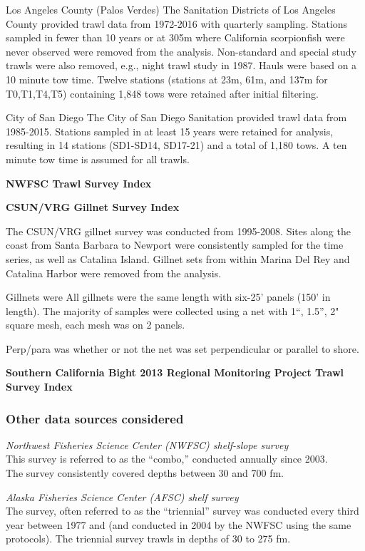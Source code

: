 \documentclass[12pt,]{article}
\begin{document}
Los Angeles County (Palos Verdes) The Sanitation Districts of Los
Angeles County provided trawl data from 1972-2016 with quarterly
sampling. Stations sampled in fewer than 10 years or at 305m where
California scorpionfish were never observed were removed from the
analysis. Non-standard and special study trawls were also removed, e.g.,
night trawl study in 1987. Hauls were based on a 10 minute tow time.
Twelve stations (stations at 23m, 61m, and 137m for T0,T1,T4,T5)
containing 1,848 tows were retained after initial filtering.

City of San Diego The City of San Diego Sanitation provided trawl data
from 1985-2015. Stations sampled in at least 15 years were retained for
analysis, resulting in 14 stations (SD1-SD14, SD17-21) and a total of
1,180 tows. A ten minute tow time is assumed for all trawls.

\textbf{NWFSC Trawl Survey Index}

\textbf{CSUN/VRG Gillnet Survey Index}

The CSUN/VRG gillnet survey was conducted from 1995-2008. Sites along
the coast from Santa Barbara to Newport were consistently sampled for
the time series, as well as Catalina Island. Gillnet sets from within
Marina Del Rey and Catalina Harbor were removed from the analysis.

Gillnets were All gillnets were the same length with six-25' panels
(150' in length). The majority of samples were collected using a net
with 1``, 1.5'', 2" square mesh, each mesh was on 2 panels.

Perp/para was whether or not the net was set perpendicular or parallel
to shore.

\textbf{Southern California Bight 2013 Regional Monitoring Project Trawl
Survey Index}

\subsubsection{Other data sources
considered}\label{other-data-sources-considered}

\emph{Northwest Fisheries Science Center (NWFSC) shelf-slope survey}\\
This survey is referred to as the ``combo,'' conducted annually since
2003.\\
The survey consistently covered depths between 30 and 700 fm.

\emph{Alaska Fisheries Science Center (AFSC) shelf survey}\\
The survey, often referred to as the ``triennial'' survey was conducted
every third year between 1977 and (and conducted in 2004 by the NWFSC
using the same protocols). The triennial survey trawls in depths of 30
to 275 fm.
\end{document}
